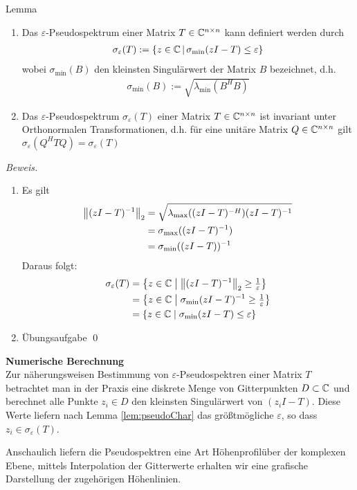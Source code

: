 \begin{colbox}{Lemma}\label{lem:pseudoChar}
  \begin{enumerate}
    \item 
      Das $\varepsilon$-Pseudospektrum einer Matrix $T\in\mathbb C^{n\times n}$ kann definiert werden 
      durch
      \begin{align*}
        \sigma_\varepsilon(T) 
        := \{z\in\mathbb C  \,|\,\sigma_{\min}(zI-T)\leq\varepsilon\}
      \end{align*}
      wobei $\sigma_{\min}(B)$ den kleinsten Singulärwert der Matrix $B$ bezeichnet, d.h. 
      \begin{align*}
        \sigma_{\min}(B) := \sqrt{\lambda_{\min}(B^HB)}
      \end{align*}
    \item 
      Das $\varepsilon$-Pseudospektrum $\sigma_\varepsilon(T)$ einer Matrix $T\in\mathbb C^{n\times n}$ ist 
      invariant unter Orthonormalen Transformationen, d.h. für eine unitäre Matrix $Q\in\mathbb C^{n\times n}$ 
      gilt $\sigma_\varepsilon(Q^HTQ) = \sigma_\varepsilon(T)$
  \end{enumerate}
\end{colbox}

\textit{Beweis.} 
\begin{enumerate}
  \item 
    Es gilt
    \begin{align*}
      \vertn{2}{(zI-T)^{-1}}_2  
      &= \sqrt{\lambda_{\max}((zI-T)^{-H})(zI-T)^{-1}} \\
      &= \sigma_{\max}((zI-T)^{-1}) \\ 
      &= \sigma_{\min}((zI-T))^{-1} \\ 
    \end{align*}
    Daraus folgt:
    \begin{align*}
      \sigma_\varepsilon(T) 
      &= \left\{ z \in \C   \;\middle|\; \vertn{2}{(zI-T)^{-1}}_2 \geq \tfrac{1}{\varepsilon} \right\} \\
      &= \left\{ z \in \C   \;\middle|\; \sigma_{\min}(zI-T)^{-1} \geq \tfrac{1}{\varepsilon} \right\} \\
      &= \left\{ z \in \C   \;\middle|\; \sigma_{\min}(zI-T) \leq \varepsilon \right\}
    \end{align*}
  \item Übungsaufgabe 
  \qed
\end{enumerate}

\textbf{Numerische Berechnung}\\
Zur näherungsweisen Bestimmung von $\varepsilon$-Pseudospektren einer Matrix $T$ betrachtet man in der Praxis eine 
diskrete Menge von Gitterpunkten $D\subset \mathbb C$ und berechnet alle Punkte $z_i\in D$ den kleinsten Singulärwert 
von $(z_i I - T)$. Diese Werte liefern nach Lemma \ref{lem:pseudoChar} das größtmögliche $\varepsilon$, so dass 
$z_i\in \sigma_{\varepsilon}(T)$. 

Anschaulich liefern die Pseudospektren eine Art Höhenprofilüber der komplexen Ebene, mittels Interpolation 
der Gitterwerte erhalten wir eine grafische Darstellung der zugehörigen Höhenlinien.
